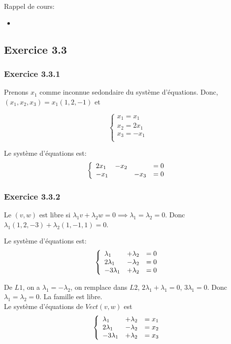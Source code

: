 \documentclass[]{book}
\theoremstyle{definition}
\begin{document}
Rappel de cours: 
\begin{itemize}
\item 
\end{itemize}

 

\subsection*{Exercice 3.3}
\subsubsection*{Exercice 3.3.1}
Prenons $x_1$ comme inconnue sedondaire du syst\`eme d'\'equations. Donc, $(x_1,x_2,x_3) = x_1(1,2,-1)$ et

$$
\left\{ 
\begin{array}{l}
x_1 = x_1 \\
x_2 = 2x_1 \\
x_3 = -x_1 \\
\end{array}
\right. 
$$

Le syst\`eme d'\'equations est:
$$
\left\{ 
\begin{array}{l l l l}
2x_1 & -x_2 & & = 0 \\
-x_1 & & -x_3 & = 0\\
\end{array}
\right. 
$$

\subsubsection*{Exercice 3.3.2}
Le $(v,w)$ est libre si $\lambda_1v + \lambda_2w = 0 \implies \lambda_1 = \lambda_2 = 0$. Donc $\lambda_1(1,2,-3) + \lambda_2(1,-1,1) = 0$. 

Le syst\`eme d'\'equations est:
$$
\left\{ 
\begin{array}{l l l}
\lambda_1 & +\lambda_2 & = 0 \\
2\lambda_1 & -\lambda_2 & = 0 \\
-3\lambda_1 & +\lambda_2 & = 0 \\
\end{array}
\right. 
$$

De $L1$, on a $\lambda_1 = -\lambda_2$, on remplace dans $L2$, $2\lambda_1 +\lambda_1 = 0$, $3\lambda_1 = 0$. Donc $\lambda_1 = \lambda_2 = 0$. La famille est libre.\\

Le syst\`eme d'\'equations de $Vect(v,w)$ est
$$
\left\{ 
\begin{array}{l l l}
\lambda_1 & +\lambda_2 & = x_1 \\
2\lambda_1 & -\lambda_2 & = x_2 \\
-3\lambda_1 & +\lambda_2 & = x_3 \\
\end{array}
\right. 
$$
\end{document}
